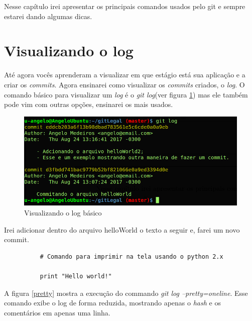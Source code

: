\documentclass[12pt,openright,oneside,a4paper,english,brazil]{abntex2}
\begin{document}
Nesse capítulo irei apresentar os principais comandos usados pelo git e sempre estarei dando algumas dicas.

\section{Visualizando o log}

Até agora vocês aprenderam a visualizar em que estágio está sua aplicação e a criar os \textit{commits}. Agora ensinarei como visualizar os \textit{commits} criados, o \textit{log}. O comando básico para visualizar um \textit{log} é o \textit{git log}(ver figura \ref{gitlog}) mas ele também pode vim com outras opções, ensinarei os mais usados.

\begin{figure}[h]
	\caption{\label{gitlog}Visualizando o log básico}
	\begin{center}
		\includegraphics[width=1\linewidth]{imagens/gitlog}
	\end{center}
\end{figure}

Irei adicionar dentro do arquivo helloWorld o texto a seguir e, farei um novo commit. 

\begin{verbatim}
          # Comando para imprimir na tela usando o python 2.x 
                   
          print "Hello world!"
\end{verbatim}

A figura \ref{pretty} mostra a execução do commando \textit{git log --pretty=oneline}. Esse comando exibe o log de forma reduzida, mostrando apenas o \textit{hash} e os comentários em apenas uma linha.
\end{document}
